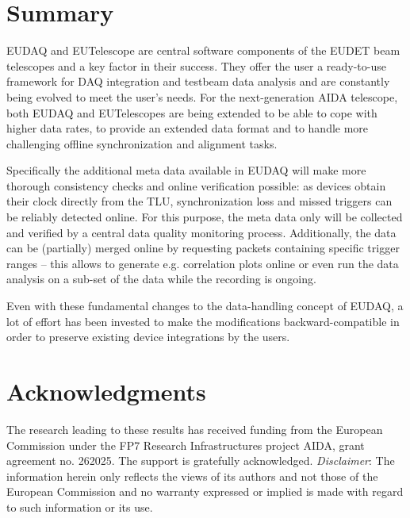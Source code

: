 \documentclass[paper=a4, fontsize=11pt, titlepage]{scrartcl}	%
\numberwithin{equation}{section}		%
\numberwithin{figure}{section}			%
\numberwithin{table}{section}           	%
\begin{document}
\section{Summary}
EUDAQ and EUTelescope are central software components of the EUDET
beam telescopes and a key factor in their success. They offer the
user a ready-to-use framework for DAQ integration and testbeam data
analysis and are constantly being evolved to meet the user's
needs. For the next-generation AIDA telescope, both EUDAQ and
EUTelescopes are being extended to be able to cope with higher data rates, to
provide an extended data format and to handle more challenging offline
synchronization and alignment tasks.

Specifically the additional meta data available in EUDAQ will make more thorough consistency
checks and online verification possible: as devices obtain their clock
directly from the TLU, synchronization loss and missed triggers can be
reliably detected online. For this purpose, the meta data only will be
collected and verified by a central data quality monitoring
process. Additionally, the data can be (partially) merged online
by requesting packets containing specific trigger ranges -- this
allows to generate e.g. correlation plots online or even run the data
analysis on a sub-set of the data while the recording is ongoing.

Even with these fundamental changes to the data-handling concept of EUDAQ, a lot of
effort has been invested to make the modifications backward-compatible
in order to preserve existing device integrations by the users.




\section{Acknowledgments}

  The research leading to these results has received funding from the
  European Commission under the FP7 Research Infrastructures project
  AIDA, grant agreement no. 262025. The support is gratefully
  acknowledged. 
  \emph{Disclaimer}: The information herein only reflects the views of its authors and not those of the European Commission and no warranty expressed or implied is made with regard to such information or its use.

\printbibliography


\end{document}
